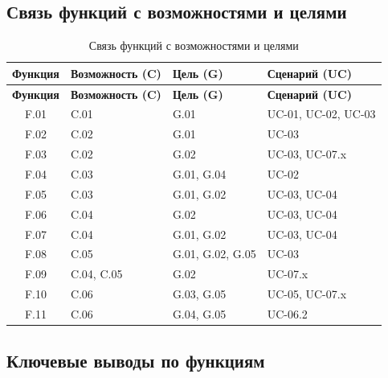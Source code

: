 \documentclass[14pt, a4paper]{extarticle}
\begin{document}
					\subsection{Связь функций с возможностями и целями}
					
					\begin{xltabular}{\textwidth}{|c|L|L|L|}
						\caption{Связь функций с возможностями и целями}\label{tab:func-cap-goals}\\
						\hline
						\textbf{Функция} & \textbf{Возможность (C)} & \textbf{Цель (G)} & \textbf{Сценарий (UC)} \\
						\hline
						\endfirsthead
						\hline
						\textbf{Функция} & \textbf{Возможность (C)} & \textbf{Цель (G)} & \textbf{Сценарий (UC)} \\
						\hline
						\endhead
						\hline
						\endfoot
						\hline
						\endlastfoot
						F.01 & C.01 & G.01 & UC-01, UC-02, UC-03 \\
						\hline
						F.02 & C.02 & G.01 & UC-03 \\
						\hline
						F.03 & C.02 & G.02 & UC-03, UC-07.x \\
						\hline
						F.04 & C.03 & G.01, G.04 & UC-02 \\
						\hline
						F.05 & C.03 & G.01, G.02 & UC-03, UC-04 \\
						\hline
						F.06 & C.04 & G.02 & UC-03, UC-04 \\
						\hline
						F.07 & C.04 & G.01, G.02 & UC-03, UC-04 \\
						\hline
						F.08 & C.05 & G.01, G.02, G.05 & UC-03 \\
						\hline
						F.09 & C.04, C.05 & G.02 & UC-07.x \\
						\hline
						F.10 & C.06 & G.03, G.05 & UC-05, UC-07.x \\
						\hline
						F.11 & C.06 & G.04, G.05 & UC-06.2 \\
						\hline
					\end{xltabular}
					
					\subsection{Ключевые выводы по функциям}
					
\end{document}
